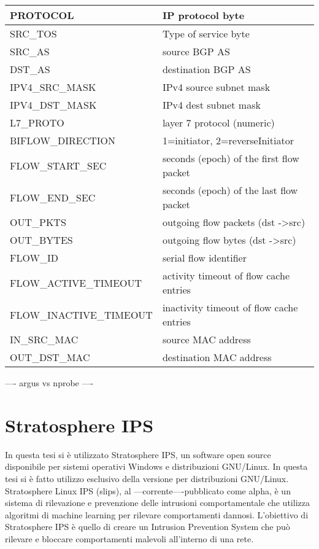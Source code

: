 \documentclass[../main.tex]{subfiles}
\begin{document}
\begin{table}[H]
\begin{tabular}{|l|l|}
PROTOCOL                             & IP protocol byte                              \\ \hline
SRC\_TOS                             & Type of service byte                          \\ \hline
SRC\_AS                              & source BGP AS                                 \\ \hline
DST\_AS                              & destination BGP AS                            \\ \hline
IPV4\_SRC\_MASK                      & IPv4 source subnet mask                       \\ \hline
IPV4\_DST\_MASK                      & IPv4 dest subnet mask                         \\ \hline
L7\_PROTO                            & layer 7 protocol (numeric)                    \\ \hline
BIFLOW\_DIRECTION                    & 1=initiator, 2=reverseInitiator               \\ \hline
FLOW\_START\_SEC                     & seconds (epoch) of the first flow packet      \\ \hline
FLOW\_END\_SEC                       & seconds (epoch) of the last flow packet       \\ \hline
OUT\_PKTS                            & outgoing flow packets (dst -\textgreater src) \\ \hline
OUT\_BYTES                           & outgoing flow bytes (dst -\textgreater src)   \\ \hline
FLOW\_ID                             & serial flow identifier                        \\ \hline
FLOW\_ACTIVE\_TIMEOUT                & activity timeout of flow cache entries        \\ \hline
FLOW\_INACTIVE\_TIMEOUT              & inactivity timeout of flow cache entries      \\ \hline
IN\_SRC\_MAC                         & source MAC address                            \\ \hline
OUT\_DST\_MAC                        & destination MAC address                       \\ \hline
\end{tabular}
\end{table}

---- argus vs nprobe ----

\section{Stratosphere IPS}
In questa tesi si è utilizzato Stratosphere IPS, un software open source disponibile per sistemi operativi Windows e distribuzioni GNU/Linux. In questa tesi si è fatto utilizzo esclusivo della versione per distribuzioni GNU/Linux.
Stratosphere Linux IPS (slips), al ---corrente----pubblicato come alpha, è un sistema di rilevazione e prevenzione delle intrusioni comportamentale che utilizza algoritmi di machine learning per rilevare comportamenti dannosi. 
L'obiettivo di Stratosphere IPS è quello di creare un Intrusion Prevention System che può rilevare e bloccare comportamenti malevoli all'interno di una rete.
\end{document}
